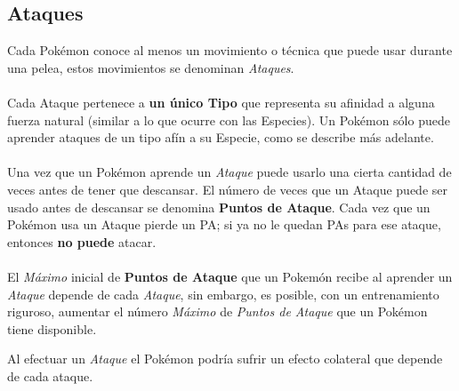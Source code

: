 \documentclass[spanish,a4paper]{article}
\begin{document}

\subsection{Ataques}

Cada Pokémon conoce al menos un movimiento o técnica que puede usar durante una pelea, estos movimientos se denominan \textit{ Ataques}.
\\\\
Cada Ataque pertenece a \textbf{ un único Tipo} que representa su afinidad a alguna fuerza natural (similar a lo que ocurre con las Especies). 
Un Pokémon sólo puede aprender ataques de un tipo afín a su Especie, como se describe más adelante.
\\\\
Una vez que un Pokémon aprende un \textit{ Ataque } puede usarlo una cierta cantidad de veces antes de tener que descansar. 
El número de veces que un Ataque puede ser usado antes de descansar se denomina \textbf{ Puntos de Ataque}. 
Cada vez que un Pokémon usa un Ataque pierde un PA; si ya no le quedan PAs para ese ataque, entonces \textbf{ no puede} atacar.
\\\\
El \textit{ Máximo} inicial de \textbf{Puntos de Ataque} que un Pokemón recibe al aprender un \textit{Ataque} depende de cada \textit{Ataque}, sin embargo, es posible, 
con un entrenamiento riguroso, aumentar el número \textit{Máximo} de \textit{Puntos de Ataque} que un Pokémon tiene disponible.


Al efectuar un \textit{Ataque} el Pokémon podría sufrir un efecto colateral que depende de cada ataque.

\end{document}
